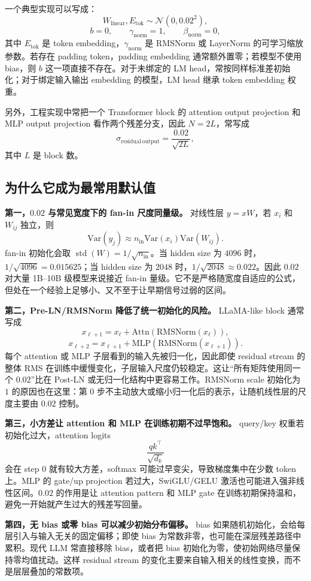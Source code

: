 \documentclass[UTF8,a4paper,11pt]{ctexart}
\newcommand{\Normal}{\mathcal{N}}
\newcommand{\std}{\operatorname{std}}
\begin{document}
一个典型实现可以写成：
\[
  W_{\mathrm{linear}},E_{\mathrm{tok}}\sim \Normal(0,0.02^2),
\]
\[
  b=0,\qquad \gamma_{\mathrm{norm}}=1,\qquad \beta_{\mathrm{norm}}=0,
\]
其中 $E_{\mathrm{tok}}$ 是 token embedding，$\gamma_{\mathrm{norm}}$ 是 RMSNorm 或 LayerNorm 的可学习缩放参数。若存在 padding token，padding embedding 通常额外置零；若模型不使用 bias，则 $b$ 这一项直接不存在。对于未绑定的 LM head，常按同样标准差初始化；对于绑定输入输出 embedding 的模型，LM head 继承 token embedding 权重。

另外，工程实现中常把一个 Transformer block 的 attention output projection 和 MLP output projection 看作两个残差分支，因此 $N=2L$，常写成
\[
  \sigma_{\mathrm{residual\ output}}=\frac{0.02}{\sqrt{2L}},
\]
其中 $L$ 是 block 数。

\subsection{为什么它成为最常用默认值}

\textbf{第一，$0.02$ 与常见宽度下的 fan-in 尺度同量级。} 对线性层 $y=xW$，若 $x_i$ 和 $W_{ij}$ 独立，则
\[
  \mathrm{Var}(y_j)\approx n_{\mathrm{in}}\mathrm{Var}(x_i)\mathrm{Var}(W_{ij}).
\]
fan-in 初始化会取 $\std(W)=1/\sqrt{n_{\mathrm{in}}}$。当 hidden size 为 $4096$ 时，$1/\sqrt{4096}=0.015625$；当 hidden size 为 $2048$ 时，$1/\sqrt{2048}\approx0.022$。因此 $0.02$ 对大量 1B--10B 级模型来说接近 fan-in 量级。它不是严格随宽度自适应的公式，但处在一个经验上足够小、又不至于让早期信号过弱的区间。

\textbf{第二，Pre-LN/RMSNorm 降低了统一初始化的风险。} LLaMA-like block 通常写成
\[
  x_{\ell+1}=x_\ell+\mathrm{Attn}(\mathrm{RMSNorm}(x_\ell)),
\]
\[
  x_{\ell+2}=x_{\ell+1}+\mathrm{MLP}(\mathrm{RMSNorm}(x_{\ell+1})).
\]
每个 attention 或 MLP 子层看到的输入先被归一化，因此即使 residual stream 的整体 RMS 在训练中缓慢变化，子层输入尺度仍较稳定。这让“所有矩阵使用同一个 $0.02$”比在 Post-LN 或无归一化结构中更容易工作。RMSNorm scale 初始化为 $1$ 的原因也在这里：第 0 步不主动放大或缩小归一化后的表示，让随机线性层的尺度主要由 $0.02$ 控制。

\textbf{第三，小方差让 attention 和 MLP 在训练初期不过早饱和。} query/key 权重若初始化过大，attention logits
\[
  \frac{qk^\top}{\sqrt{d_k}}
\]
会在 step 0 就有较大方差，softmax 可能过早变尖，导致梯度集中在少数 token 上。MLP 的 gate/up projection 若过大，SwiGLU/GELU 激活也可能进入强非线性区间。$0.02$ 的作用是让 attention pattern 和 MLP gate 在训练初期保持温和，避免一开始就产生过大的残差写回量。

\textbf{第四，无 bias 或零 bias 可以减少初始分布偏移。} bias 如果随机初始化，会给每层引入与输入无关的固定偏移；即使 bias 为常数非零，也可能在深层残差路径中累积。现代 LLM 常直接移除 bias，或者把 bias 初始化为零，使初始网络尽量保持零均值扰动。这样 residual stream 的变化主要来自输入相关的线性变换，而不是层层叠加的常数项。
\end{document}
